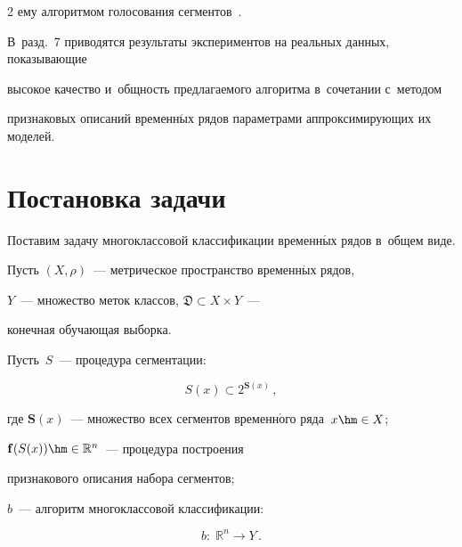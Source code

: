 \begin{multicols}{2}
ему алгоритмом голосования сегментов~\cite{geurts2005segment}.


В~разд.~7 приводятся результаты экспериментов на реальных данных, показывающие 


высокое качество и~общность предлагаемого алгоритма в~сочетании с~методом 


признаковых описаний временн$\acute{\mbox{ы}}$х рядов параметрами аппроксимирующих их моделей.








\section{Постановка задачи}







Поставим задачу многоклассовой классификации временн$\acute{\mbox{ы}}$х рядов в~общем виде.


Пусть $(X,\rho)$~--- метрическое пространство временн$\acute{\mbox{ы}}$х рядов, 


$Y$~--- множество меток классов, $\mathfrak{D}\subset X\times Y$~--- 


конечная обучающая выборка.





Пусть~$S$~--- процедура сегментации:


  \begin{equation}


  \label{eq:segmentation}


  S(x)\subset 2^{\mathbf{S}(x)}\,,


  \end{equation}


  где $\mathbf{S}(x)$~--- множество всех сегментов временн$\acute{\mbox{о}}$го ряда~$x\hm\in X$;


  $\mathbf{f}(S(x))\hm\in\mathbb{R}^n$~--- процедура по\-стро\-ения 


  признакового описания набора сегментов;


  $b$~--- алгоритм многоклассовой классификации:


  \begin{equation}


  \label{eq:classification}


  b:\;\mathbb{R}^n\to Y\,.



\end{equation}
\end{multicols}
